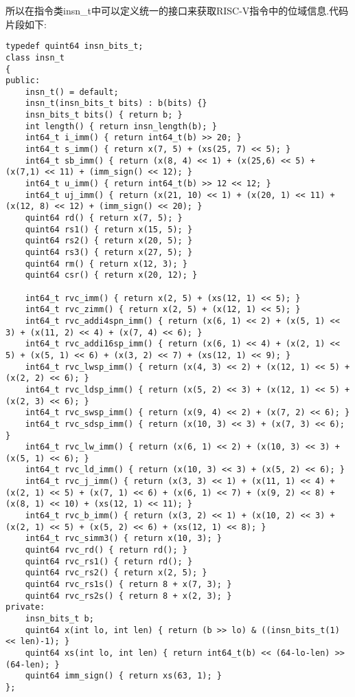 所以在指令类insn\_t中可以定义统一的接口来获取RISC-V指令中的位域信息.代码片段如下:
\begin{lstlisting}
typedef quint64 insn_bits_t;
class insn_t
{
public:
    insn_t() = default;
    insn_t(insn_bits_t bits) : b(bits) {}
    insn_bits_t bits() { return b; }
    int length() { return insn_length(b); }
    int64_t i_imm() { return int64_t(b) >> 20; }
    int64_t s_imm() { return x(7, 5) + (xs(25, 7) << 5); }
    int64_t sb_imm() { return (x(8, 4) << 1) + (x(25,6) << 5) + (x(7,1) << 11) + (imm_sign() << 12); }
    int64_t u_imm() { return int64_t(b) >> 12 << 12; }
    int64_t uj_imm() { return (x(21, 10) << 1) + (x(20, 1) << 11) + (x(12, 8) << 12) + (imm_sign() << 20); }
    quint64 rd() { return x(7, 5); }
    quint64 rs1() { return x(15, 5); }
    quint64 rs2() { return x(20, 5); }
    quint64 rs3() { return x(27, 5); }
    quint64 rm() { return x(12, 3); }
    quint64 csr() { return x(20, 12); }

    int64_t rvc_imm() { return x(2, 5) + (xs(12, 1) << 5); }
    int64_t rvc_zimm() { return x(2, 5) + (x(12, 1) << 5); }
    int64_t rvc_addi4spn_imm() { return (x(6, 1) << 2) + (x(5, 1) << 3) + (x(11, 2) << 4) + (x(7, 4) << 6); }
    int64_t rvc_addi16sp_imm() { return (x(6, 1) << 4) + (x(2, 1) << 5) + (x(5, 1) << 6) + (x(3, 2) << 7) + (xs(12, 1) << 9); }
    int64_t rvc_lwsp_imm() { return (x(4, 3) << 2) + (x(12, 1) << 5) + (x(2, 2) << 6); }
    int64_t rvc_ldsp_imm() { return (x(5, 2) << 3) + (x(12, 1) << 5) + (x(2, 3) << 6); }
    int64_t rvc_swsp_imm() { return (x(9, 4) << 2) + (x(7, 2) << 6); }
    int64_t rvc_sdsp_imm() { return (x(10, 3) << 3) + (x(7, 3) << 6); }
    int64_t rvc_lw_imm() { return (x(6, 1) << 2) + (x(10, 3) << 3) + (x(5, 1) << 6); }
    int64_t rvc_ld_imm() { return (x(10, 3) << 3) + (x(5, 2) << 6); }
    int64_t rvc_j_imm() { return (x(3, 3) << 1) + (x(11, 1) << 4) + (x(2, 1) << 5) + (x(7, 1) << 6) + (x(6, 1) << 7) + (x(9, 2) << 8) + (x(8, 1) << 10) + (xs(12, 1) << 11); }
    int64_t rvc_b_imm() { return (x(3, 2) << 1) + (x(10, 2) << 3) + (x(2, 1) << 5) + (x(5, 2) << 6) + (xs(12, 1) << 8); }
    int64_t rvc_simm3() { return x(10, 3); }
    quint64 rvc_rd() { return rd(); }
    quint64 rvc_rs1() { return rd(); }
    quint64 rvc_rs2() { return x(2, 5); }
    quint64 rvc_rs1s() { return 8 + x(7, 3); }
    quint64 rvc_rs2s() { return 8 + x(2, 3); }
private:
    insn_bits_t b;
    quint64 x(int lo, int len) { return (b >> lo) & ((insn_bits_t(1) << len)-1); }
    quint64 xs(int lo, int len) { return int64_t(b) << (64-lo-len) >> (64-len); }
    quint64 imm_sign() { return xs(63, 1); }
};
\end{lstlisting}

